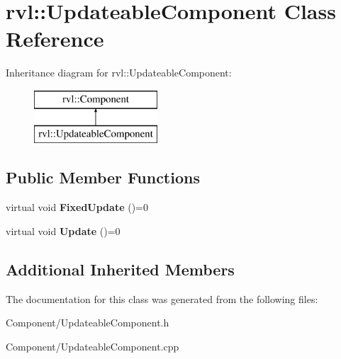 \hypertarget{classrvl_1_1_updateable_component}{}\section{rvl\+:\+:Updateable\+Component Class Reference}
\label{classrvl_1_1_updateable_component}
Inheritance diagram for rvl\+:\+:Updateable\+Component\+:\begin{figure}[H]
\begin{center}
\leavevmode
\includegraphics[height=2.000000cm]{classrvl_1_1_updateable_component}
\end{center}
\end{figure}
\subsection*{Public Member Functions}
\begin{DoxyCompactItemize}
\item 
\mbox{\label{classrvl_1_1_updateable_component_a2fe539ca7ce0f7e54377e0c4fd0757fc}} 
virtual void {\bfseries Fixed\+Update} ()=0
\item 
\mbox{\label{classrvl_1_1_updateable_component_ac57d1edb8c648fd12447bbb1dd8411d3}} 
virtual void {\bfseries Update} ()=0
\end{DoxyCompactItemize}
\subsection*{Additional Inherited Members}


The documentation for this class was generated from the following files\+:\begin{DoxyCompactItemize}
\item 
Component/Updateable\+Component.\+h\item 
Component/Updateable\+Component.\+cpp\end{DoxyCompactItemize}
